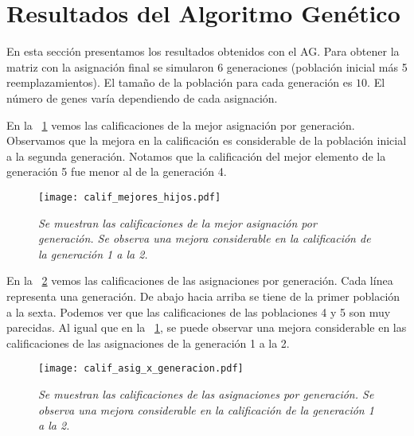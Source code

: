 \section{Resultados del Algoritmo Genético}

En esta sección presentamos los resultados obtenidos con el AG. Para obtener la matriz con la asignación final se simularon $6$ generaciones (población inicial más 5 reemplazamientos). El tamaño de la población para cada generación es $10$. El número de genes varía dependiendo de cada asignación.


En la \figurename{~\ref{EjcalifMejoresHijos}} vemos las calificaciones de la mejor asignación por generación. Observamos que la mejora en la calificación es considerable de la población inicial a la segunda generación. Notamos que la calificación del mejor elemento de la generación 5 fue menor al de la generación 4.

\begin{figure}[H]
\centering
\texttt{[image: calif\_mejores\_hijos.pdf]} %
\caption[\textit{Calificaciones de mejores asignaciones}]{\textit{Se muestran las calificaciones de la mejor asignación por generación. Se observa una mejora considerable en la calificación de la generación 1 a la 2.}}\label{EjcalifMejoresHijos}
\end{figure}

%

En la \figurename{~\ref{EjcalifAsig_x_generacion}} vemos las calificaciones de las asignaciones por generación. Cada línea representa una generación. De abajo hacia arriba se tiene de la primer población a la sexta. Podemos ver que las calificaciones de las poblaciones 4 y 5 son muy parecidas. Al igual que en la \figurename{~\ref{EjcalifMejoresHijos}}, se puede observar una mejora considerable en las calificaciones de las asignaciones de la generación 1 a la 2.

\begin{figure}[H]
\centering
\texttt{[image: calif\_asig\_x\_generacion.pdf]} %
\caption[\textit{Calificaciones de asignaciones por generación}]{\textit{Se muestran las calificaciones de las asignaciones por generación. Se observa una mejora considerable en la calificación de la generación 1 a la 2.}}\label{EjcalifAsig_x_generacion}
\end{figure}


